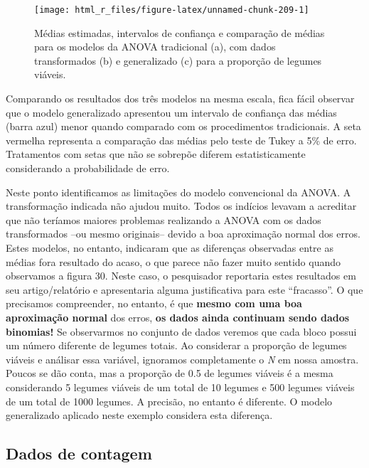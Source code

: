 \documentclass[
]{book}
\numberwithin{equation}{section}
\newcommand{\indt}[1]{\index{#1|ST}}
\begin{document}
\begin{figure}

{\centering \texttt{[image: html\_r\_files/figure-latex/unnamed-chunk-209-1]} 

}

\caption{Médias estimadas, intervalos de confiança e comparação de médias para os modelos da ANOVA tradicional (a), com dados transformados (b) e generalizado (c) para a proporção de legumes viáveis.}\label{fig:unnamed-chunk-209}
\end{figure}

Comparando os resultados dos três modelos na mesma escala, fica fácil observar que o modelo generalizado apresentou um intervalo de confiança das médias (barra azul) menor quando comparado com os procedimentos tradicionais. A seta vermelha representa a comparação das médias pelo teste de Tukey a 5\% de erro. Tratamentos com setas que não se sobrepõe diferem estatisticamente considerando a probabilidade de erro.

Neste ponto identificamos as limitações do modelo convencional da ANOVA. A transformação indicada não ajudou muito. Todos os indícios levavam a acreditar que não teríamos maiores problemas realizando a ANOVA\indt{ANOVA} com os dados transformados --ou mesmo originais-- devido a boa aproximação normal dos erros. Estes modelos, no entanto, indicaram que as diferenças observadas entre as médias fora resultado do acaso, o que parece não fazer muito sentido quando observamos a figura 30. Neste caso, o pesquisador reportaria estes resultados em seu artigo/relatório e apresentaria alguma justificativa para este ``fracasso''. O que precisamos compreender, no entanto, é que \textbf{mesmo com uma boa aproximação normal} dos erros, \textbf{os dados ainda continuam sendo dados binomias!} Se observarmos no conjunto de dados veremos que cada bloco possui um número diferente de legumes totais. Ao considerar a proporção de legumes viáveis e análisar essa variável, ignoramos completamente o \emph{N} em nossa amostra. Poucos se dão conta, mas a proporção de 0.5 de legumes viáveis é a mesma considerando 5 legumes viáveis de um total de 10 legumes e 500 legumes viáveis de um total de 1000 legumes. A precisão, no entanto é diferente. O modelo generalizado aplicado neste exemplo considera esta diferença.

\hypertarget{dados-de-contagem}{%
\subsection{Dados de contagem}\label{dados-de-contagem}}
\end{document}
